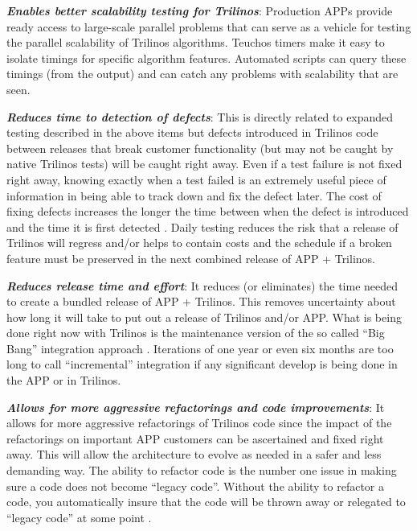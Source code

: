 \documentclass[pdf,ps2pdf,11pt]{SANDreport}
\begin{document}
{}\textit{\textbf{Enables better scalability testing for Trilinos}}: Production
APPs provide ready access to large-scale parallel problems that can serve as a
vehicle for testing the parallel scalability of Trilinos algorithms.  Teuchos
timers make it easy to isolate timings for specific algorithm features.
Automated scripts can query these timings (from the output) and can catch any
problems with scalability that are seen.

{}\textit{\textbf{Reduces time to detection of defects}}: This is directly related
to expanded testing described in the above items but defects introduced in
Trilinos code between releases that break customer functionality (but may not
be caught by native Trilinos tests) will be caught right away.  Even if a test
failure is not fixed right away, knowing exactly when a test failed is an
extremely useful piece of information in being able to track down and fix the
defect later.  The cost of fixing defects increases the longer the time
between when the defect is introduced and the time it is first detected
{}\cite{book:code-complete-2}.  Daily testing reduces the risk that a release
of Trilinos will regress and/or helps to contain costs and the schedule if a
broken feature must be preserved in the next combined release of APP +
Trilinos.

{}\textit{\textbf{Reduces release time and effort}}: It reduces (or eliminates)
the time needed to create a bundled release of APP + Trilinos.  This removes
uncertainty about how long it will take to put out a release of Trilinos
and/or APP.  What is being done right now with Trilinos is the maintenance
version of the so called ``Big Bang'' integration approach
{}\cite{book:code-complete-2}.  Iterations of one year or even six months are
too long to call ``incremental'' integration if any significant develop is
being done in the APP or in Trilinos.

{}\textit{\textbf{Allows for more aggressive refactorings and code improvements}}:
It allows for more aggressive refactorings of Trilinos code since the impact
of the refactorings on important APP customers can be ascertained and fixed
right away.  This will allow the architecture to evolve as needed in a safer
and less demanding way.  The ability to refactor code is the number one issue
in making sure a code does not become ``legacy code''.  Without the ability to
refactor a code, you automatically insure that the code will be thrown away or
relegated to ``legacy code'' at some point {}\cite{book:code-complete-2}.
\end{document}
